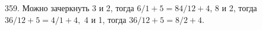 359. Можно зачеркнуть 3 и 2, тогда $6/1+5=84/12+4$, 8 и 2, тогда $36/12+5=4/1+4,$ 4 и 1, тогда $36/12+5=8/2+4.$\\
